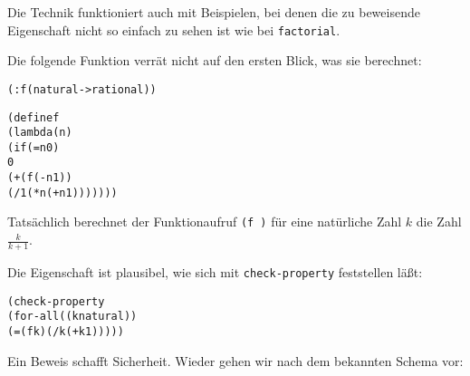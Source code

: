 Die Technik funktioniert auch mit Beispielen, bei denen die zu
beweisende Eigenschaft nicht so einfach zu sehen ist wie bei
\texttt{factorial}.

Die folgende Funktion verrät nicht auf den ersten Blick, was
sie berechnet:
%
\begin{alltt}
(: f (natural -> rational))

(define f
  (lambda (n)
    (if (= n 0)
        0
        (+ (f (- n 1))
           (/ 1 (* n (+ n 1)))))))
\end{alltt}
%
Tatsächlich berechnet der Funktionaufruf \texttt{(f )} für
eine natürliche Zahl $k$ die Zahl
\(\frac{k}{k+1}\).

Die Eigenschaft ist plausibel, wie sich mit \texttt{check-property}
feststellen läßt:
%
\begin{alltt}
(check-property
 (for-all ((k natural))
   (= (f k) (/ k (+ k 1)))))
\end{alltt}
%
Ein Beweis schafft Sicherheit.  Wieder gehen wir nach dem bekannten
Schema vor:
%
